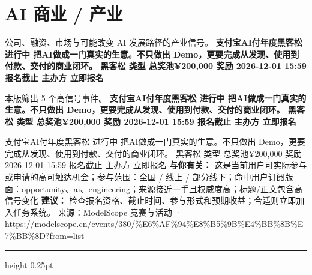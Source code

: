 \documentclass[10.5pt]{ctexart}
\begin{document}
\section*{AI 商业 / 产业}
{\color{ormuted} 公司、融资、市场与可能改变 AI 发展路径的产业信号。}
\vspace{2mm}
{\LARGE\bfseries 支付宝AI付年度黑客松 进行中 把AI做成一门真实的生意。不只做出 Demo，更要完成从发现、使用到付款、交付的商业闭环。 黑客松 类型 总奖池¥200,000 奖励 2026-12-01 15:59 报名截止 主办方 立即报名}\par
\vspace{1mm}
{\color{ormuted} 本版筛出 5 个高信号事件。}
\vspace{3mm}
{\Large\bfseries 支付宝AI付年度黑客松 进行中 把AI做成一门真实的生意。不只做出 Demo，更要完成从发现、使用到付款、交付的商业闭环。 黑客松 类型 总奖池¥200,000 奖励 2026-12-01 15:59 报名截止 主办方 立即报名}\par
支付宝AI付年度黑客松 进行中 把AI做成一门真实的生意。不只做出 Demo，更要完成从发现、使用到付款、交付的商业闭环。 黑客松 类型 总奖池¥200,000 奖励 2026-12-01 15:59 报名截止 主办方 立即报名
\textbf{与你有关：} 这是当前用户可实际参与或申请的高可触达机会；参与范围：全国 / 线上 / 部分线下；命中用户订阅版面：opportunity、ai、engineering；来源接近一手且权威度高；标题/正文包含高信号变化
\textbf{建议：} 检查报名资格、截止时间、参与形式和预期收益；合适则立即加入任务系统。
{\footnotesize\color{ormuted} 来源：ModelScope 竞赛与活动 · \url{https://modelscope.cn/events/380/%E6%AF%94%E8%B5%9B%E4%BB%8B%E7%BB%8D?from=list}}
\vspace{4mm}
\hrule height 0.25pt
\vspace{3mm}
\end{document}
